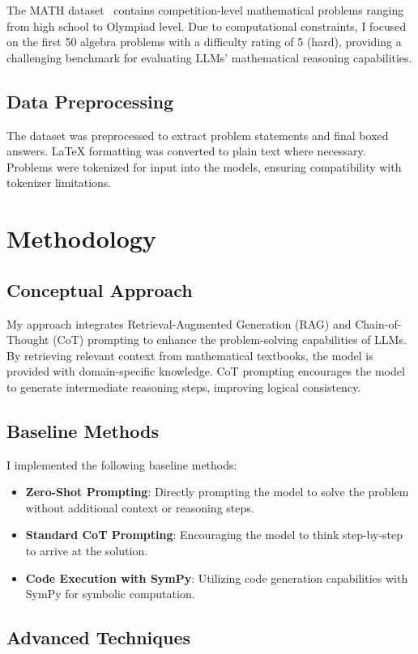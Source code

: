 \documentclass[11pt,a4paper]{article}
\begin{document}
The MATH dataset~\cite{hendrycks2021measuringmathematicalproblemsolving} contains competition-level mathematical problems ranging from high school to Olympiad level. Due to computational constraints, I focused on the first 50 algebra problems with a difficulty rating of 5 (hard), providing a challenging benchmark for evaluating LLMs' mathematical reasoning capabilities.

\subsection{Data Preprocessing}
The dataset was preprocessed to extract problem statements and final boxed answers. LaTeX formatting was converted to plain text where necessary. Problems were tokenized for input into the models, ensuring compatibility with tokenizer limitations.

\section{Methodology}
\subsection{Conceptual Approach}
My approach integrates Retrieval-Augmented Generation (RAG) and Chain-of-Thought (CoT) prompting to enhance the problem-solving capabilities of LLMs. By retrieving relevant context from mathematical textbooks, the model is provided with domain-specific knowledge. CoT prompting encourages the model to generate intermediate reasoning steps, improving logical consistency.

\subsection{Baseline Methods}
I implemented the following baseline methods:
\begin{itemize}[noitemsep,nolistsep]
    \item \textbf{Zero-Shot Prompting}: Directly prompting the model to solve the problem without additional context or reasoning steps.
    \item \textbf{Standard CoT Prompting}: Encouraging the model to think step-by-step to arrive at the solution.
    \item \textbf{Code Execution with SymPy}: Utilizing code generation capabilities with SymPy for symbolic computation.
\end{itemize}

\subsection{Advanced Techniques}
\end{document}
